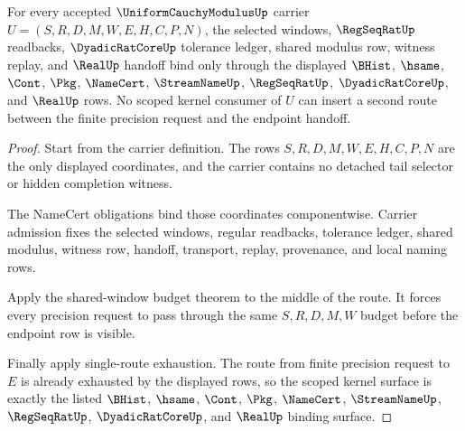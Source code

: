 \begin{theorem}\label{thm:uniform-cauchy-modulus-scoped-kernel-binding}
For every accepted $\UniformCauchyModulusUp$ carrier $U=(S,R,D,M,W,E,H,C,P,N)$, the selected windows, $\RegSeqRatUp$ readbacks, $\DyadicRatCoreUp$ tolerance ledger, shared modulus row, witness replay, and $\RealUp$ handoff bind only through the displayed $\BHist$, $\hsame$, $\Cont$, $\Pkg$, $\NameCert$, $\StreamNameUp$, $\RegSeqRatUp$, $\DyadicRatCoreUp$, and $\RealUp$ rows. No scoped kernel consumer of $U$ can insert a second route between the finite precision request and the endpoint handoff.
\end{theorem}
\begin{proof}
Start from the carrier definition. The rows $S,R,D,M,W,E,H,C,P,N$ are the only displayed coordinates, and the carrier contains no detached tail selector or hidden completion witness.

The NameCert obligations bind those coordinates componentwise. Carrier admission fixes the selected windows, regular readbacks, tolerance ledger, shared modulus, witness row, handoff, transport, replay, provenance, and local naming rows.

Apply the shared-window budget theorem to the middle of the route. It forces every precision request to pass through the same $S,R,D,M,W$ budget before the endpoint row is visible.

Finally apply single-route exhaustion. The route from finite precision request to $E$ is already exhausted by the displayed rows, so the scoped kernel surface is exactly the listed $\BHist$, $\hsame$, $\Cont$, $\Pkg$, $\NameCert$, $\StreamNameUp$, $\RegSeqRatUp$, $\DyadicRatCoreUp$, and $\RealUp$ binding surface.
\end{proof}

